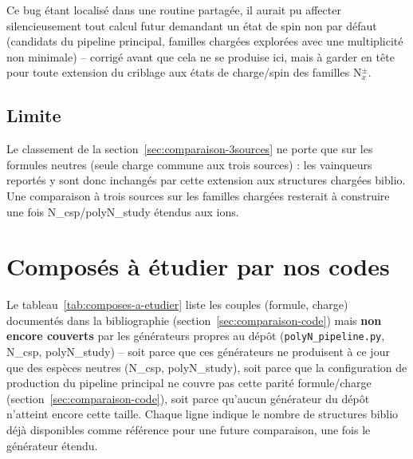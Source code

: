 \documentclass[11pt,a4paper]{article}
\begin{document}
Ce bug \'etant localis\'e dans une routine partag\'ee, il aurait pu affecter
silencieusement tout calcul futur demandant un \'etat de spin non
par d\'efaut (candidats du pipeline principal, familles charg\'ees explor\'ees
avec une multiplicit\'e non minimale) -- corrig\'e avant que cela ne se
produise ici, mais \`a garder en t\^ete pour toute extension du criblage aux
\'etats de charge/spin des familles N$_x^\pm$.

\subsection{Limite}

Le classement de la section~\ref{sec:comparaison-3sources} ne porte que sur
les formules neutres (seule charge commune aux trois sources) : les
vainqueurs report\'es y sont donc inchang\'es par cette extension aux
structures charg\'ees biblio. Une comparaison \`a trois sources sur les
familles charg\'ees resterait \`a construire une fois N\_csp/polyN\_study
\'etendus aux ions.

\section{Compos\'es \`a \'etudier par nos codes}
\label{sec:composes-a-etudier}

Le tableau~\ref{tab:composes-a-etudier} liste les couples (formule, charge)
document\'es dans la bibliographie (section~\ref{sec:comparaison-code}) mais
\textbf{non encore couverts} par les g\'en\'erateurs propres au d\'ep\^ot
(\texttt{polyN\_pipeline.py}, N\_csp, polyN\_study) -- soit parce que ces
g\'en\'erateurs ne produisent \`a ce jour que des esp\`eces neutres
(N\_csp, polyN\_study), soit parce que la configuration de production du
pipeline principal ne couvre pas cette parit\'e formule/charge
(section~\ref{sec:comparaison-code}), soit parce qu'aucun g\'en\'erateur du
d\'ep\^ot n'atteint encore cette taille. Chaque ligne indique le nombre de
structures biblio d\'ej\`a disponibles comme r\'ef\'erence pour une future
comparaison, une fois le g\'en\'erateur \'etendu.
\end{document}
